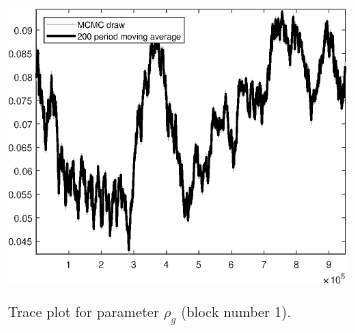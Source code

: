 \begin{figure}[H]
\centering
  \includegraphics[width=0.8\textwidth]{BRS_growth_util_sectoral/graphs/TracePlot_rho_g_blck_1}\\
    \caption{Trace plot for parameter ${\rho_g}$ (block number 1).}
\end{figure}
